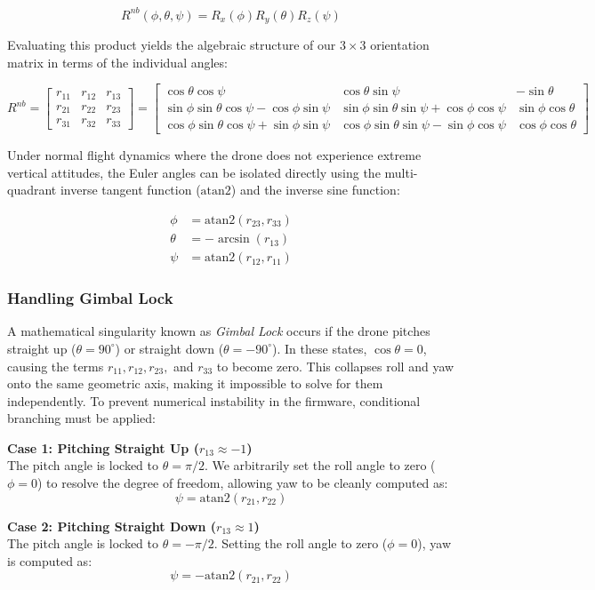 \documentclass{article}
\begin{document}
\[
R^{nb}(\phi, \theta, \psi) = R_x(\phi) R_y(\theta) R_z(\psi)
\]

\noindent Evaluating this product yields the algebraic structure of our $3\times3$ orientation matrix in terms of the individual angles:

\[
R^{nb} = \begin{bmatrix}
	r_{11} & r_{12} & r_{13} \\
	r_{21} & r_{22} & r_{23} \\
	r_{31} & r_{32} & r_{33}
\end{bmatrix} =
\begin{bmatrix}
	\cos\theta\cos\psi & \cos\theta\sin\psi & -\sin\theta \\
	\sin\phi\sin\theta\cos\psi - \cos\phi\sin\psi & \sin\phi\sin\theta\sin\psi + \cos\phi\cos\psi & \sin\phi\cos\theta \\
	\cos\phi\sin\theta\cos\psi + \sin\phi\sin\psi & \cos\phi\sin\theta\sin\psi - \sin\phi\cos\psi & \cos\phi\cos\theta
\end{bmatrix}
\]

\noindent Under normal flight dynamics where the drone does not experience extreme vertical attitudes, the Euler angles can be isolated directly using the multi-quadrant inverse tangent function ($\text{atan2}$) and the inverse sine function:

\begin{align*}
	\phi   &= \text{atan2}\left(r_{23}, r_{33}\right) \\
	\theta &= -\arcsin\left(r_{13}\right) \\
	\psi   &= \text{atan2}\left(r_{12}, r_{11}\right)
\end{align*}

\subsubsection{Handling Gimbal Lock}

A mathematical singularity known as \emph{Gimbal Lock} occurs if the drone pitches straight up ($\theta = 90^\circ$) or straight down ($\theta = -90^\circ$). In these states, $\cos\theta = 0$, causing the terms $r_{11}, r_{12}, r_{23},$ and $r_{33}$ to become zero. This collapses roll and yaw onto the same geometric axis, making it impossible to solve for them independently. To prevent numerical instability in the firmware, conditional branching must be applied:

\vspace{1em}
\noindent \textbf{Case 1: Pitching Straight Up ($r_{13} \approx -1$)} \\
The pitch angle is locked to $\theta = \pi/2$. We arbitrarily set the roll angle to zero ($\phi = 0$) to resolve the degree of freedom, allowing yaw to be cleanly computed as:
\[
\psi = \text{atan2}\left(r_{21}, r_{22}\right)
\]

\vspace{1em}
\noindent \textbf{Case 2: Pitching Straight Down ($r_{13} \approx 1$)} \\
The pitch angle is locked to $\theta = -\pi/2$. Setting the roll angle to zero ($\phi = 0$), yaw is computed as:
\[
\psi = -\text{atan2}\left(r_{21}, r_{22}\right)
\]
\end{document}
